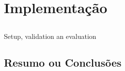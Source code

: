 \chapter{Implementação}\label{chap:setup-validation}

\section*{}

Setup, validation an evaluation

\section{Resumo ou Conclusões}


